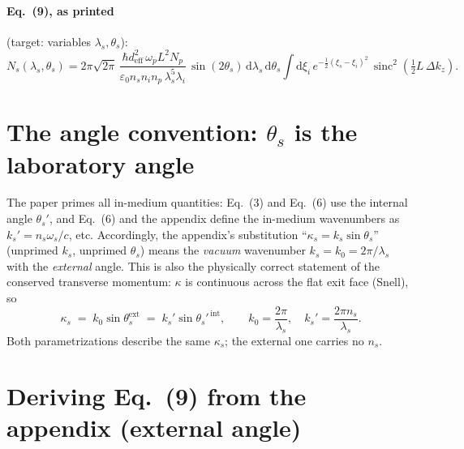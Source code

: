 \documentclass[11pt]{article}
\newcommand{\sinc}{\operatorname{sinc}}
\newcommand{\dd}{\mathrm{d}}
\begin{document}
\paragraph{Eq.~(9), as printed} (target: variables $\lambda_s,\theta_s$):
\begin{equation}
N_s(\lambda_s,\theta_s) =
2\pi\sqrt{2\pi}\,
\frac{\hbar d_{\mathrm{eff}}^2\,\omega_p L^2 N_p}
{\varepsilon_0 n_s n_i n_p\,\lambda_s^5\lambda_i}\,
\sin(2\theta_s)\,\dd\lambda_s\,\dd\theta_s
\int \dd\xi_i\, e^{-\frac12(\xi_s-\xi_i)^2}\,
\sinc^2\!\left(\tfrac12 L\,\Delta k_z\right).
\tag{9}
\end{equation}

\section*{The angle convention: $\theta_s$ is the laboratory angle}

The paper primes all in-medium quantities: Eq.~(3) and Eq.~(6) use the
internal angle $\theta_s'$, and Eq.~(6) and the appendix define the in-medium
wavenumbers as $k_s' = n_s\omega_s/c$, etc. Accordingly, the appendix's
substitution ``$\kappa_s = k_s\sin\theta_s$'' (unprimed $k_s$, unprimed
$\theta_s$) means the \emph{vacuum} wavenumber $k_s = k_0 = 2\pi/\lambda_s$
with the \emph{external} angle. This is also the physically correct statement
of the conserved transverse momentum: $\kappa$ is continuous across the flat
exit face (Snell), so
\begin{equation}
\kappa_s \;=\; k_0\sin\theta_s^{\text{ext}}
        \;=\; k_s'\sin\theta_s'^{\,\text{int}},
\qquad k_0 = \frac{2\pi}{\lambda_s},\quad k_s' = \frac{2\pi n_s}{\lambda_s}.
\end{equation}
Both parametrizations describe the same $\kappa_s$; the external one carries
no $n_s$.

\section*{Deriving Eq.~(9) from the appendix (external angle)}
\end{document}
